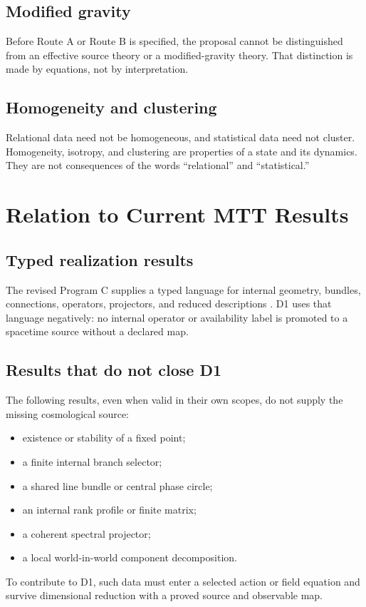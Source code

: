 \documentclass[11pt]{article}
\begin{document}
\subsection{Modified gravity}

Before Route A or Route B is specified, the proposal cannot be distinguished
from an effective source theory or a modified-gravity theory.  That distinction
is made by equations, not by interpretation.

\subsection{Homogeneity and clustering}

Relational data need not be homogeneous, and statistical data need not
cluster.  Homogeneity, isotropy, and clustering are properties of a state and
its dynamics.  They are not consequences of the words ``relational'' and
``statistical.''

\section{Relation to Current MTT Results}

\subsection{Typed realization results}

The revised Program C supplies a typed language for internal geometry,
bundles, connections, operators, projectors, and reduced descriptions
\cite{Nero2026ProgramC}.  D1 uses that language negatively: no internal
operator or availability label is promoted to a spacetime source without a
declared map.

\subsection{Results that do not close D1}

The following results, even when valid in their own scopes, do not supply the
missing cosmological source:
\begin{itemize}
\item existence or stability of a fixed point;
\item a finite internal branch selector;
\item a shared line bundle or central phase circle;
\item an internal rank profile or finite matrix;
\item a coherent spectral projector;
\item a local world-in-world component decomposition.
\end{itemize}
To contribute to D1, such data must enter a selected action or field equation
and survive dimensional reduction with a proved source and observable map.
\end{document}
